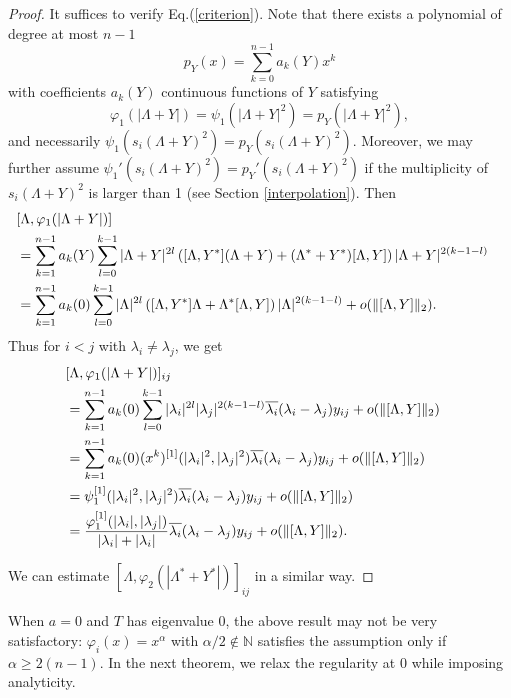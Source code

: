 \documentclass[12pt]{article}
\theoremstyle{definition}
\numberwithin{equation}{section}
\newcommand{\N}{\mathbb{N}}
\begin{document}
\begin{proof} It suffices to verify Eq.(\ref{criterion}). 
Note that there exists a polynomial of degree at most $n-1$  
\[p_Y(x)=\sum_{k=0}^{n-1}a_k(Y)x^k\]
with coefficients $a_k(Y)$ continuous functions of $Y$ satisfying 
\[\varphi_1(|\Lambda+Y|)=\psi_1(|\Lambda+Y|^2)=p_Y(|\Lambda+Y|^2),\]  
and necessarily $\psi_1(s_i(\Lambda+Y)^2)=p_Y(s_i(\Lambda+Y)^2)$. 
Moreover, we may further assume ${\psi_1}'(s_i(\Lambda+Y)^2)={p_Y}'(s_i(\Lambda+Y)^2)$ 
if the multiplicity of $s_i(\Lambda+Y)^2$ is larger than 1 (see Section \ref{interpolation}). 
Then 
\begin{align*}
\lefteqn{[\Lambda,\varphi_1(|\Lambda+Y|)]} \\
 &=\sum_{k=1}^{n-1}a_k(Y)\sum_{l=0}^{k-1}|\Lambda+Y|^{2l}\left([\Lambda,Y^*](\Lambda+Y)+(\Lambda^*+Y^*)[\Lambda,Y]
 \right)|\Lambda+Y|^{2(k-1-l)} \\
 &=\sum_{k=1}^{n-1}a_k(0)\sum_{l=0}^{k-1}|\Lambda|^{2l}\left([\Lambda,Y^*]\Lambda+\Lambda^*[\Lambda,Y]\right)|\Lambda|^{2(k-1-l)}
 +o(\|[\Lambda,Y]\|_2). 
\end{align*}
Thus for $i<j$ with $\lambda_i\neq \lambda_j$, we get 
\begin{align*}
\lefteqn{[\Lambda,\varphi_1(|\Lambda+Y|)]_{ij}} \\
&=\sum_{k=1}^{n-1}a_k(0)\sum_{l=0}^{k-1}|\lambda_i|^{2l}|\lambda_j|^{2(k-1-l)}\overline{\lambda_i}(\lambda_i-\lambda_j)y_{ij}
+o(\|[\Lambda,Y]\|_2)\\
 &=\sum_{k=1}^{n-1}a_k(0)(x^k)^{[1]}(|\lambda_i|^{2},|\lambda_j|^{2})\overline{\lambda_i}(\lambda_i-\lambda_j)y_{ij}+o(\|[\Lambda,Y]\|_2)\\
 &=\psi_1^{[1]}(|\lambda_i|^2,|\lambda_j|^2)\overline{\lambda_i}(\lambda_i-\lambda_j)y_{ij}+o(\|[\Lambda,Y]\|_2)\\
  &=\frac{\varphi_1^{[1]}(|\lambda_i|,|\lambda_j|)}{|\lambda_i|+|\lambda_i|}\overline{\lambda_i}(\lambda_i-\lambda_j)y_{ij}
  +o(\|[\Lambda,Y]\|_2). 
\end{align*}

We can estimate $[\Lambda,\varphi_2(|\Lambda^*+Y^*|)]_{ij}$ in a similar way.  
\end{proof}

When $a=0$ and $T$ has eigenvalue 0, the above result may not be very satisfactory: 
$\varphi_i(x)=x^\alpha$ with $\alpha/2\notin \N$ satisfies the assumption only if $\alpha\geq 2(n-1)$. 
In the next theorem, we relax the regularity at 0 while imposing analyticity. 
\end{document}
